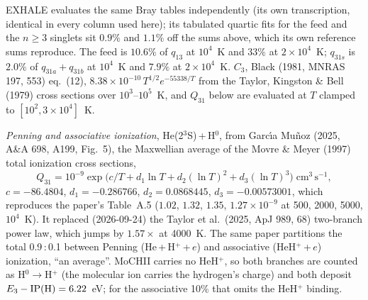 \documentclass[english,a4paper]{my_memo}
\newcommand{\cmc}{\mathrm{cm^{3}\,s^{-1}}}
\begin{document}
EXHALE evaluates the same Bray tables independently (its own transcription,
identical in every column used here); its tabulated quartic fits for the feed
and the $n\ge3$ singlets sit $0.9\%$ and $1.1\%$ off the sums above, which
its own reference sums reproduce.  The feed is $10.6\%$ of $q_{13}$ at
$10^4$~K and $33\%$ at $2{\times}10^4$~K; $q_{31s}$ is $2.0\%$ of
$q_{31a}+q_{31b}$ at $10^4$~K and $7.9\%$ at $2{\times}10^4$~K.  $C_3$,
Black (1981, MNRAS 197, 553) eq.~(12),
$8.38{\times}10^{-10}\,T^{1/2}e^{-55338/T}$ from the Taylor, Kingston \& Bell
(1979) cross sections over $10^3$--$10^5$~K, and $Q_{31}$ below are evaluated
at $T$ clamped to $[10^2, 3{\times}10^4]$~K.

\emph{Penning and associative ionization}, He(2$^3$S)\,+\,H$^0$, from
Garc\'{\i}a Mu\~noz (2025, A\&A 698, A199, Fig.~5), the Maxwellian average of
the Movre \& Meyer (1997) total ionization cross sections,
\begin{equation}
  Q_{31} = 10^{-9}\exp\!\big(c/T + d_1\ln T + d_2(\ln T)^2 + d_3(\ln T)^3\big)
  \;\cmc,
\end{equation}
$c = -86.4804$, $d_1 = -0.286766$, $d_2 = 0.0868445$, $d_3 = -0.00573001$,
which reproduces the paper's Table~A.5 ($1.02$, $1.32$, $1.35$,
$1.27{\times}10^{-9}$ at 500, 2000, 5000, $10^4$~K).  It replaced
(2026-09-24) the Taylor et al.\ (2025, ApJ 989, 68) two-branch power law,
which jumps by $1.57\times$ at 4000~K.  The same paper partitions the total
0.9\,:\,0.1 between Penning (He\,+\,H$^+$\,+\,$e$) and associative
(HeH$^+$\,+\,$e$) ionization, ``an average''.  MoCHII carries no HeH$^+$,
so both branches are counted as H$^0\rightarrow$H$^+$ (the molecular ion
carries the hydrogen's charge) and both deposit $E_3 - {\rm IP(H)} =
6.22$~eV; for the associative 10\% that omits the HeH$^+$ binding.
\end{document}
